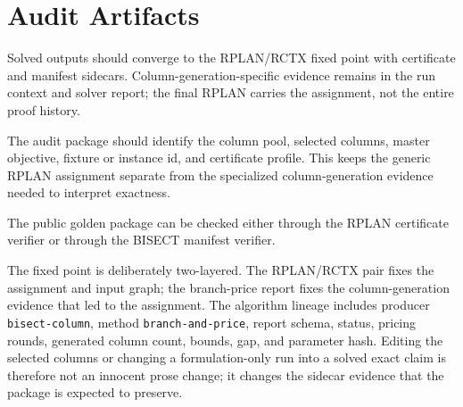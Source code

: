 \section{Audit Artifacts}

Solved outputs should converge to the RPLAN/RCTX fixed point with certificate
and manifest sidecars. Column-generation-specific evidence remains in the run
context and solver report; the final RPLAN carries the assignment, not the
entire proof history.

The audit package should identify the column pool, selected columns, master
objective, fixture or instance id, and certificate profile. This keeps the
generic RPLAN assignment separate from the specialized column-generation
evidence needed to interpret exactness.

The public golden package can be checked either through the RPLAN certificate
verifier or through the BISECT manifest verifier.

The fixed point is deliberately two-layered. The RPLAN/RCTX pair fixes the
assignment and input graph; the branch-price report fixes the column-generation
evidence that led to the assignment. The algorithm lineage includes producer
\texttt{bisect-column}, method \texttt{branch-and-price}, report schema,
status, pricing rounds, generated column count, bounds, gap, and parameter
hash. Editing the selected columns or changing a formulation-only run into a
solved exact claim is therefore not an innocent prose change; it changes the
sidecar evidence that the package is expected to preserve.
